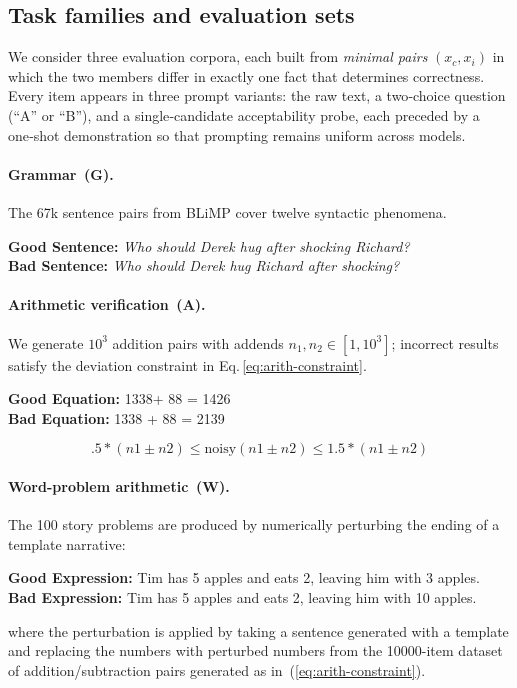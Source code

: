 \documentclass{article}
\begin{document}
\subsection{Task families and evaluation sets}
\label{subsec:tasks}

We consider three evaluation corpora, each built from \emph{minimal pairs}
$(x_c,x_i)$ in which the two members differ in exactly one fact that determines
correctness.  Every item appears in three prompt variants: the raw text, a
two‑choice question (“A” or “B”), and a single‑candidate acceptability probe,
each preceded by a one‑shot demonstration so that prompting remains uniform
across models.

\paragraph{Grammar \,(G).}
The 67k sentence pairs from BLiMP \citep{warstadt2020blimp} cover twelve
syntactic phenomena.  
\begin{examplebox}\footnotesize
\textbf{Good Sentence:} \textit{Who should Derek hug after shocking Richard?}\\[2pt]
\textbf{Bad Sentence:} \textit{Who should Derek hug Richard after shocking?}
\end{examplebox}

\paragraph{Arithmetic verification \,(A).}
We generate $10^3$ addition pairs with addends
$n_1,n_2\in[1,10^3]$; incorrect results satisfy the deviation constraint in
Eq.\,\eqref{eq:arith-constraint}.
\begin{examplebox}\footnotesize
\textbf{Good Equation:} 1338+ 88 = 1426\\[2pt]
\textbf{Bad Equation:} 1338 + 88 = 2139
\end{examplebox}

\begin{equation}
    \label{eq:arith-constraint}
    .5 * (n1 \pm n2) \leq \text{noisy} (n1 \pm n2) \leq 1.5 * (n1 \pm n2)
\end{equation}

\paragraph{Word-problem arithmetic \,(W).}
The 100 story problems are produced by numerically perturbing the ending of a
template narrative:
\begin{examplebox}\footnotesize
\textbf{Good Expression:} Tim has 5 apples and eats 2, leaving him with 3 apples.\\[2pt]
\textbf{Bad Expression:} Tim has 5 apples and eats 2, leaving him with 10 apples.
\end{examplebox}
where the perturbation is applied by taking a sentence generated with a template and replacing the numbers with perturbed numbers from 
the 10000-item dataset of addition/subtraction pairs generated as in~(\ref{eq:arith-constraint}).
\end{document}
